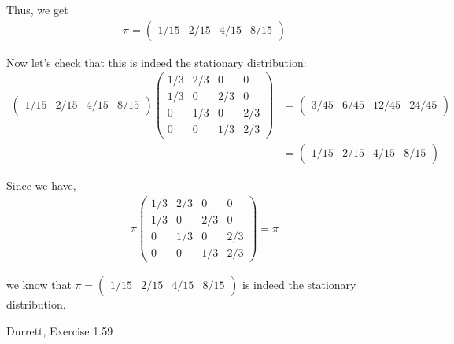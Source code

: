\documentclass[12pt]{article}
\newenvironment{problem}[2][Problem]{\begin{trivlist}
\item[\hskip \labelsep {\bfseries #1}\hskip \labelsep {\bfseries #2.}]}{\end{trivlist}}
\begin{document}
\begin{enumerate}[label=(\alph*)]
Thus, we get
\begin{align*}
\pi = \begin{pmatrix}
1/15 & 2/15 & 4/15 & 8/15
\end{pmatrix}
\end{align*}

Now let's check that this is indeed the stationary distribution:
\begin{align*}
\begin{pmatrix}
1/15 & 2/15 & 4/15 & 8/15
\end{pmatrix} \begin{pmatrix}
    1/3 & 2/3 & 0 & 0\\
    1/3 & 0 & 2/3 & 0\\
    0 & 1/3 & 0 & 2/3\\
    0 & 0 & 1/3 & 2/3
\end{pmatrix} &= \begin{pmatrix}
3/45 & 6/45 & 12/45 & 24/45
\end{pmatrix}\\
&= \begin{pmatrix}
1/15 & 2/15 & 4/15 & 8/15
\end{pmatrix}
\end{align*}

Since we have,
\begin{align*}
\pi \begin{pmatrix}
    1/3 & 2/3 & 0 & 0\\
    1/3 & 0 & 2/3 & 0\\
    0 & 1/3 & 0 & 2/3\\
    0 & 0 & 1/3 & 2/3
\end{pmatrix} = \pi
\end{align*}

we know that $\pi = \begin{pmatrix}
1/15 & 2/15 & 4/15 & 8/15
\end{pmatrix}$ is indeed the stationary distribution.
\end{enumerate}

\begin{problem}{3}
Durrett, Exercise 1.59
\end{problem}
\end{document}
